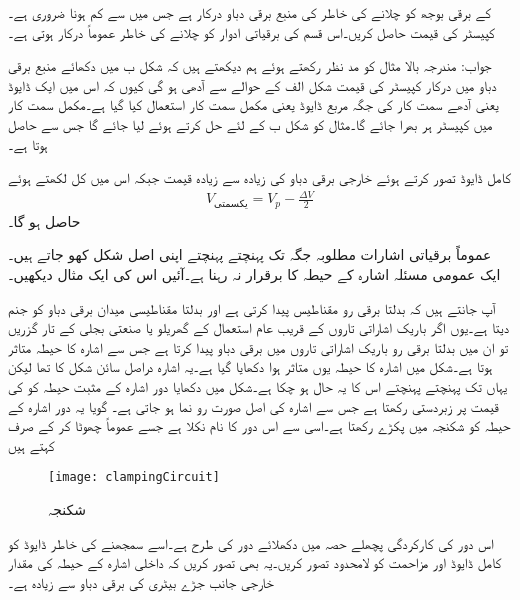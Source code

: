  کے برقی بوجھ کو چلانے کی خاطر  کی منبع برقی دباو درکار ہے جس میں   سے کم ہونا ضروری ہے۔کپیسٹر کی قیمت حاصل کریں۔اس قسم کی  برقیاتی ادوار کو چلانے کی خاطر عموماً درکار ہوتی ہے۔

جواب: 
مندرجہ بالا مثال کو مد نظر رکھتے ہوئے ہم دیکھتے ہیں کہ شکل  ب میں دکھائے منبع برقی دباو میں درکار کپیسٹر کی قیمت شکل  الف کے حوالے سے آدھی ہو گی کیوں کہ اس میں ایک ڈایوڈ یعنی آدھے سمت کار کی جگہ مربع ڈایوڈ یعنی مکمل سمت کار استعمال کیا گیا ہے۔مکمل سمت کار میں کپیسٹر ہر  بھرا جائے گا۔مثال  کو شکل  ب کے لئے حل کرتے ہوئے  لیا جائے گا جس سے  حاصل ہوتا ہے۔ 
 
کامل ڈایوڈ تصور کرتے ہوئے خارجی برقی دباو کی زیادہ سے زیادہ قیمت  جبکہ اس میں کل   لکھتے ہوئے
\begin{align}
V_{\text{یکسمتی}}=V_p-\frac{\Delta V}{2}
\end{align}
حاصل ہو گا۔

عموماً برقیاتی اشارات مطلوبہ جگہ تک پہنچتے پہنچتے اپنی اصل شکل کھو جاتے ہیں۔ ایک عمومی مسئلہ اشارہ کے حیطہ کا برقرار نہ رہنا ہے۔آئیں اس کی ایک مثال دیکھیں۔

آپ جانتے ہیں کہ بدلتا برقی رو مقناطیس پیدا کرتی ہے اور بدلتا مقناطیسی میدان برقی دباو کو جنم دیتا ہے۔یوں اگر باریک اشاراتی تاروں کے قریب عام استعمال کے گھریلو یا صنعتی بجلی کے تار گزریں تو ان میں بدلتا برقی رو باریک اشاراتی تاروں میں برقی دباو پیدا کرتا ہے جس سے اشارہ کا حیطہ متاثر ہوتا ہے۔شکل   میں اشارہ   کا حیطہ یوں متاثر ہوا دکھایا گیا ہے۔یہ اشارہ دراصل سائن شکل کا تھا لیکن یہاں تک پہنچتے پہنچتے اس کا یہ حال ہو چکا ہے۔شکل   میں دکھایا دور اشارہ کے مثبت حیطہ کو  کی قیمت پر زبردستی رکھتا ہے جس سے اشارہ کی اصل صورت رو نما ہو جاتی ہے۔ گویا یہ دور اشارہ کے حیطہ کو شکنجہ میں پکڑے رکھتا ہے۔اسی سے اس دور کا نام   نکلا ہے جسے عموماً چھوٹا  کر کے صرف  کہتے ہیں
\begin{figure}
\centering
\texttt{[image: clampingCircuit]}
\caption{شکنجہ}
\label{شکل_شکنجہ}
\end{figure}
اس دور کی کارکردگی پچھلے حصہ میں دکھلائے دور کی طرح ہے۔اسے سمجھنے کی خاطر ڈایوڈ   کو کامل ڈایوڈ اور مزاحمت  کو لامحدود تصور کریں۔یہ بھی تصور کریں کہ داخلی اشارہ  کے حیطہ  کی مقدار خارجی جانب جڑے بیٹری کی برقی دباو  سے زیادہ ہے۔


